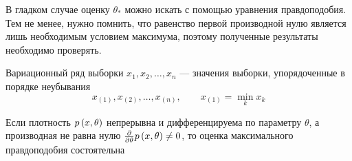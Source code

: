 \begin{remark}
    В гладком случае оценку $\theta_*$ можно искать
    с помощью уравнения правдоподобия.
    Тем не менее, нужно помнить, что равенство первой производной нулю
    является лишь необходимым условием максимума,
    поэтому полученные результаты необходимо проверять.
\end{remark}

\begin{definition}
    Вариационный ряд выборки $x_1, x_2, \dots, x_n$ --- значения выборки,
    упорядоченные в порядке неубывания
    $$x_{\left(1\right)}, x_{\left(2\right)}, \dots, x_{\left(n\right)},\qquad
    x_{\left(1\right)}=\underset{k}\min{x_k}$$
\end{definition}

\begin{theorem}
    Если плотность $p\left(x,\theta\right)$
    непрерывна и дифференцируема по параметру $\theta$,
    а производная не равна нулю
    $\frac{\partial}{\partial\theta}p\left(x,\theta\right)\neq 0$,
    то оценка максимального правдоподобия состоятельна
\end{theorem}
